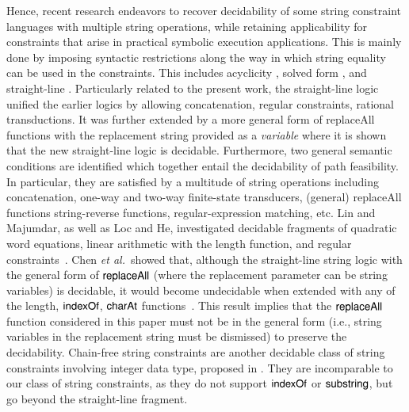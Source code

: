 {Hence,  recent research endeavors %
to recover decidability of some string constraint languages with multiple string operations, while retaining applicability for constraints that
arise in practical symbolic execution applications. This is mainly done by imposing syntactic restrictions along the way in which string equality can be used in the constraints. This includes acyclicity \cite{Abdulla14,BFL13}, solved form \cite{Vijay-length}, and straight-line \cite{LB16,HJLRV18,CCH+18}.
Particularly related to the present work, the straight-line logic \cite{LB16}  unified the earlier logics by allowing concatenation, regular constraints, rational
transductions. %
It was further extended %
by a more general form of replaceAll functions with the replacement string provided as a
\emph{variable} \cite{CCH+18} where it is shown that the new straight-line logic %
is decidable.  Furthermore, two general semantic conditions are identified  \cite{CHL+19}  which together entail the decidability of path
feasibility. In particular, they are satisfied by a multitude of string operations
including concatenation, one-way and two-way finite-state transducers, (general) replaceAll functions
string-reverse functions, regular-expression matching, etc. 
}
%
Lin and Majumdar, as well as Loc and He, investigated decidable fragments of %
quadratic word equations, linear arithmetic with the length function, and regular constraints~\cite{LinM18,LeH18}. Chen \emph{et al.}\ showed that, although the straight-line string logic with the general form of $\mathsf{replaceAll}$ (where the replacement parameter can be string variables) is decidable, it would become undecidable when extended with any of the length, $\mathsf{indexOf}$, $\mathsf{charAt}$ functions~\cite{CCH+18}. This result implies that the $\mathsf{replaceAll}$ function considered in this paper must not be in the general form (i.e., string variables in the replacement string must be dismissed) to preserve the decidability. Chain-free string constraints are another decidable class of string constraints involving integer data type, proposed in \cite{AbdullaA+19}. They are incomparable to our class of string constraints, as they do not support $\mathsf{indexOf}$ or $\mathsf{substring}$, but go  beyond the straight-line fragment.


